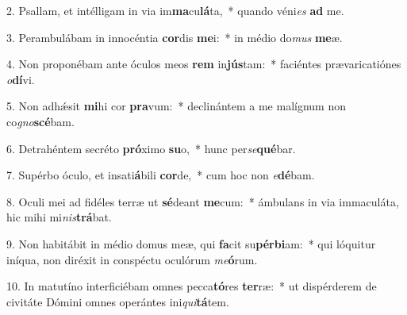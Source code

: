 2. Psallam, et intélligam in via im\textbf{ma}cu\textbf{lá}ta,~*  quando véni\textit{es} \textbf{ad} me.\

3. Perambulábam in innocéntia \textbf{cor}dis \textbf{me}i:~*  in médio do\textit{mus} \textbf{me}æ.\

4. Non proponébam ante óculos meos \textbf{rem} in\textbf{jús}tam:~*  faciéntes prævaricatiónes \textit{o}\textbf{dí}vi.\

5. Non adhǽsit \textbf{mi}hi cor \textbf{pra}vum:~*  declinántem a me malígnum non co\textit{gno}\textbf{scé}bam.\

6. Detrahéntem secréto \textbf{pró}ximo \textbf{su}o,~*  hunc per\textit{se}\textbf{qué}bar.\

7. Supérbo óculo, et insati\textbf{á}bili \textbf{cor}de,~*  cum hoc non \textit{e}\textbf{dé}bam.\

8. Oculi mei ad fidéles terræ ut \textbf{sé}deant \textbf{me}cum:~*  ámbulans in via immaculáta, hic mihi mi\textit{nis}\textbf{trá}bat.\

9. Non habitábit in médio domus meæ, qui \textbf{fa}cit su\textbf{pér}\textbf{bi}am:~*  qui lóquitur iníqua, non diréxit in conspéctu oculórum \textit{me}\textbf{ó}rum.\

10. In matutíno interficiébam omnes pecca\textbf{tó}res \textbf{ter}ræ:~*  ut dispérderem de civitáte Dómini omnes operántes ini\textit{qui}\textbf{tá}tem.\

